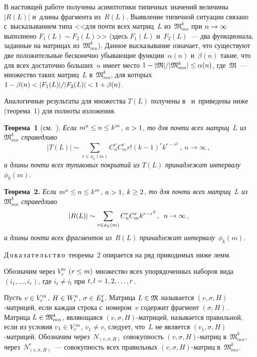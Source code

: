 \begin{multicols}{2}
  В настоящей работе получены асимптотики типичных значений величины 
$\vert R(L)\vert$ и~длины фрагмента из~$R(L)$. Выявление типичной ситуации 
связано с~высказыванием типа <<для почти всех матриц~$L$ 
из~$\mathfrak{M}^k_{mn}$ при $n\hm\to \infty$ выполнено $F_1(L)\sim 
F_2(L)$>> (здесь $F_1(L)$ и~$F_2(L)$~--- два функционала, заданные на 
матрицах из~$\mathfrak{M}^k_{mn}$). Данное высказывание означает, что 
существуют две положительные бесконечно убывающие функции~$\alpha(n)$ 
и~$\beta(n)$ такие, что для всех достаточно больших~$n$ имеет место $1\hm- 
\vert \mathfrak{M}\vert/\vert \mathfrak{M}^k_{mn}\vert \hm\leq \alpha(n)$, 
где~$\mathfrak{M}$~--- множество таких матриц~$L$ 
в~$\mathfrak{M}^k_{mn}$, для которых\linebreak $1\hm- \beta(n)\hm< \vert F_1(L)\vert 
/\vert F_2(L)\vert \hm< 1\hm+ \beta(n)$.
  
  Аналогичные результаты для множества $T(L)$ получены  
в~\cite{5-duk, 6-duk} и~приведены ниже (теорема~1) для полноты изложения.
  
  \smallskip
  
  \noindent
  \textbf{Теорема~1} (см.~\cite{5-duk, 6-duk}). \textit{Если $m^a\hm\leq 
n\hm\leq k^m$, $a\hm> 1$, то для почти всех матриц~$L$ 
из~$\mathfrak{M}^k_{mn}$ справедливо}
  $$
  \vert T(L)\vert \sim \sum\limits_{r\in \phi_k(m)} C_n^r C^r_m r! (k-1)^r k^{r-
r^2}\,,\ n\to\infty\,,
  $$
\textit{и длины почти всех тупиковых покрытий из $T(L)$ принадлежат 
интервалу}~$\phi_k(m)$.

\smallskip
  
  \noindent
  \textbf{Теорема~2.} \textit{Если $m^a\hm\leq n\hm\leq k^m$, $a\hm>1$, 
$k\hm\geq 2$, то для почти всех матриц~$L$ из~$\mathfrak{M}^k_{mn}$ 
справедливо}
  $$
  \vert R(L)\vert \sim\sum\limits_{r\in \phi_k(m)} C_n^r C_m^r k^{r-r^2}\,,\enskip 
n\to \infty\,,
  $$
\textit{и длины почти всех фрагментов из~$R(L)$ принадлежат 
интервалу}~$\phi_k(m)$.

\smallskip

  \noindent
  Д\,о\,к\,а\,з\,а\,т\,е\,л\,ь\,с\,т\,в\,о\ тео\-ре\-мы~2 опирается на ряд приводимых 
ниже лемм.
   
  Обозначим через $V_r^m$ $(r\hm\leq m)$ множество всех упорядоченных 
наборов вида $(i_1, \ldots , i_r)$, где $i_t\not= i_l$ при $t, l \hm= 1,2,\ldots , r$.
  
  Пусть $v\hm\in V_r^m$, $H\hm\in W_r^n$, $\sigma \hm\in E_k^r$. Мат\-ри\-ца 
$L\hm\in \mathfrak{M}$ называется $(v,\sigma, H)$-мат\-ри\-цей, если каждая 
строка с~номером~$v$ содержит фрагмент $(\sigma, H)$. Матрица $L\hm\in 
\mathfrak{M}^k_{mn}$, являющаяся $(v,\sigma, H)$-мат\-ри\-цей, называется 
правильной, если из условия $v_1\hm\in V_r^m$, $v_1\not= v$, следует, 
что~$L$ не является $(v_1,\sigma,H)$-мат\-ри\-цей. Обозначим 
через~$N_{(v,\sigma,H)}$ совокупность $(v,\sigma, H)$-мат\-риц 
в~$\mathfrak{M}_{mn}^k$, через~$N^*_{(v,\sigma,H)}$~--- совокупность всех 
правильных $(v,\sigma,H)$-мат\-риц в~$\mathfrak{M}^k_{mn}$.
  

\end{multicols}
